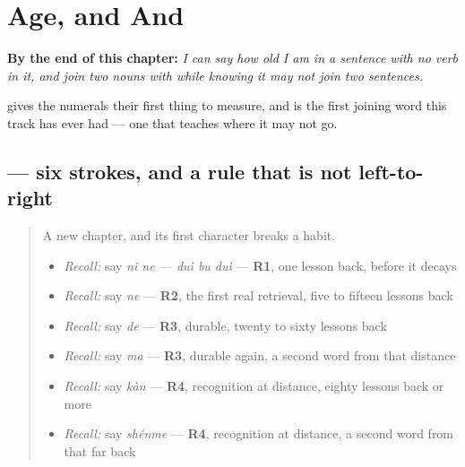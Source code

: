 
\chapter{Age, and And}
\label{ch:zh-sui-he}

\begin{chapteropening}
\textbf{By the end of this chapter:} \emph{I can say how old I am in a sentence with no verb in it, and join two nouns with  while knowing it may not join two sentences.}

 gives the numerals their first thing to measure, and  is the first joining word this track has ever had — one that teaches where it may not go.
\end{chapteropening}

\section[\texorpdfstring{\zh{岁} (suì)}{岁 (suì)}]{ — six strokes, and a rule that is not left-to-right}

\label{lesson:ZH-W27-sui}



\begin{quote}
A new chapter, and its first character breaks a habit.

\begin{itemize}
\raggedright
  \item \emph{Recall:} say \emph{nǐ ne — duì bu duì} — \textbf{R1}, one lesson back, before it decays
  \item \emph{Recall:} say \emph{ne} — \textbf{R2}, the first real retrieval, five to fifteen lessons back
  \item \emph{Recall:} say \emph{de} — \textbf{R3}, durable, twenty to sixty lessons back
  \item \emph{Recall:} say \emph{ma} — \textbf{R3}, durable again, a second word from that distance
  \item \emph{Recall:} say \emph{kàn} — \textbf{R4}, recognition at distance, eighty lessons back or more
  \item \emph{Recall:} say \emph{shénme} — \textbf{R4}, recognition at distance, a second word from that far back
\end{itemize}
\end{quote}

